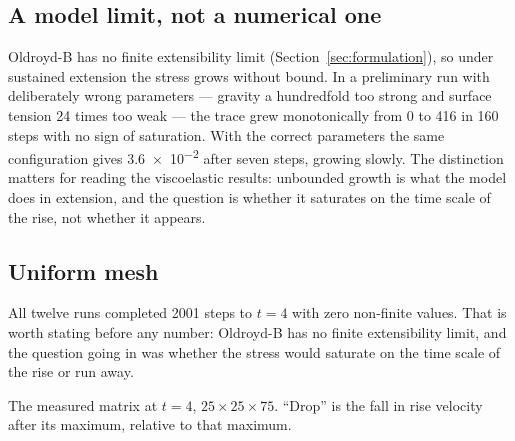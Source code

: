 \subsection{A model limit, not a numerical one}

Oldroyd-B has no finite extensibility limit (Section~\ref{sec:formulation}), so
under sustained extension the stress grows without bound. In a preliminary run
with deliberately wrong parameters --- gravity a hundredfold too strong and
surface tension 24 times too weak --- the trace grew monotonically from 0 to 416
in 160 steps with no sign of saturation. With the correct parameters the same
configuration gives \num{3.6e-2} after seven steps, growing slowly. The
distinction matters for reading the viscoelastic results: unbounded growth is
what the model does in extension, and the question is whether it saturates on
the time scale of the rise, not whether it appears.

\subsection{Uniform mesh}

All twelve runs completed 2001 steps to $t=4$ with zero non-finite values.
That is worth stating before any number: Oldroyd-B has no finite extensibility
limit, and the question going in was whether the stress would saturate on the
time scale of the rise or run away.

\begin{table}[htbp]
\centering
\caption{The measured matrix at $t=4$, $25\times25\times75$. ``Drop'' is the
fall in rise velocity after its maximum, relative to that maximum.}
\label{tab:vemeasured}
\small
\begin{adjustbox}{max width=\linewidth}
\end{adjustbox}
\end{table}

